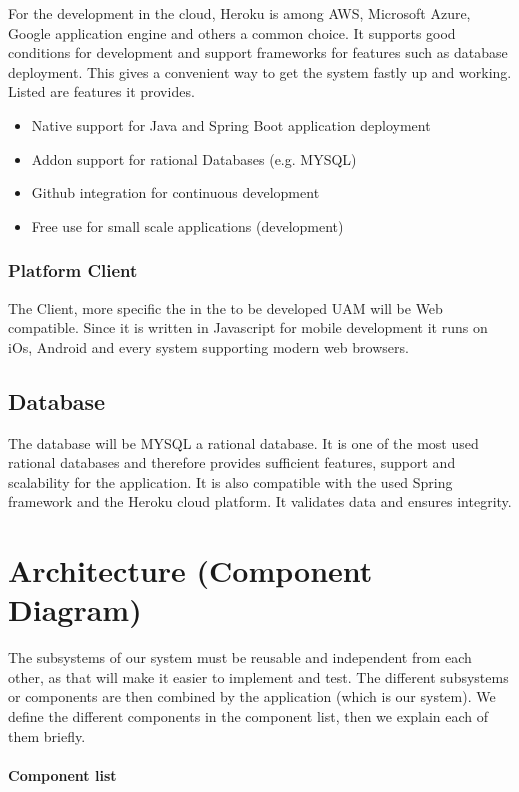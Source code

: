 \documentclass[a4paper,11pt]{article}
\begin{document}
For the development in the cloud, Heroku is among AWS, Microsoft Azure, Google application engine and others a common choice. It supports good conditions for development and support frameworks for features such as database deployment. This gives a convenient way to get the system fastly up and working. Listed are features it provides.
\begin{itemize}
\item Native support for Java and Spring Boot application deployment
\item Addon support for rational Databases (e.g. MYSQL)
\item Github integration for continuous development
\item Free use for small scale applications (development)
\end{itemize}

\subsubsection{Platform Client}
The Client, more specific the in the to be developed UAM will be Web compatible. Since it is written in Javascript for mobile development it runs on iOs, Android and every system supporting modern web browsers.

\subsection{Database}
The database will be MYSQL a rational database.
It is one of the most used rational databases and therefore provides sufficient features, support and scalability for the application. It is also compatible with the used Spring framework and the Heroku cloud platform. It validates data and ensures integrity.




\section{Architecture (Component Diagram)} \label{Architecture}
The subsystems of our system must be reusable and independent from each
other, as that will make it easier to implement and test. The different
subsystems or components are then combined by the application (which is
our system). We define the different components in the component list,
then we explain each of them briefly.

\paragraph{Component list}\label{component-list}
\end{document}
